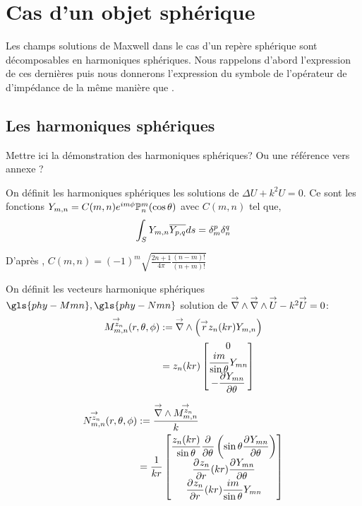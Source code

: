 \section{Cas d'un objet sphérique}

    Les champs solutions de Maxwell dans le cas d'un repère sphérique sont décomposables en harmoniques sphériques. Nous rappelons d'abord l’expression de ces dernières puis nous donnerons l'expression du symbole de l'opérateur de d'impédance de la même manière que \cite{cheng_spectral_1993}.

    \subsection{Les harmoniques sphériques}

        \begin{TODO}
          Mettre ici la démonstration des harmoniques sphériques? Ou une référence vers annexe ?
        \end{TODO}

        On définit les harmoniques sphériques les solutions de \(\Delta U + k^2 U = 0 \). Ce sont les fonctions \(Y_{m,n} = C(m,n) e^{im\phi}\mathbb{P}^m_n(\cos \theta) \) avec \(C(m,n)\) tel que,
        \[
         \displaystyle\int_S Y_{m,n} {\overline{Y_{p,q}}} ds = \delta_m^p \delta_n^q
        \]

        D’après \cite[p.~24]{nedelec_acoustic_2001}, \( C(m,n) = (-1)^m\sqrt{\frac{2n+1}{4\pi}\frac{(n-m)!}{(n+m)!}}\)

        On définit les vecteurs harmonique sphériques\(\gls{phy-Mmn} ,\gls{phy-Nmn}\) solution de \({\overset{\rightarrow}{\nabla}}\wedge {\overset{\rightarrow}{\nabla}}\wedge {\overset{\rightarrow}{U}} - k^2 {\overset{\rightarrow}{U}} = 0 \):
        \begin{align}
         \label{eq:defMmn}
          \Mmn[z_n](\rtp) &:= \vrot \left( \vect{r} z_n(kr) Y_{m,n} \right)\\
          &= z_n(kr)
          \begin{bmatrix}
            0 
            \\
            \frac{im}{\sin\theta}Y_{mn}
            \\
            - \ddr{\theta}{Y_{mn}}
          \end{bmatrix}
        \end{align}

        \begin{align}
        \label{eq:defNnn}
          \Nmn[z_n](\rtp) &:= \frac{\vrot \Mmn[z_n]}{k} \\
          &= \frac{1}{kr}\begin{bmatrix}
            \frac{z_n(kr)}{\sin\theta}\ddr{\theta}{}\left(\sin\theta\ddr{\theta}{Y_{mn}}\right)
            \\
            \ddr{r}{z_n}(kr)\ddr{\theta}{Y_{mn}}
            \\
            \ddr{r}{z_n}(kr)\frac{im}{\sin\theta}Y_{mn}
          \end{bmatrix}
        \end{align}

